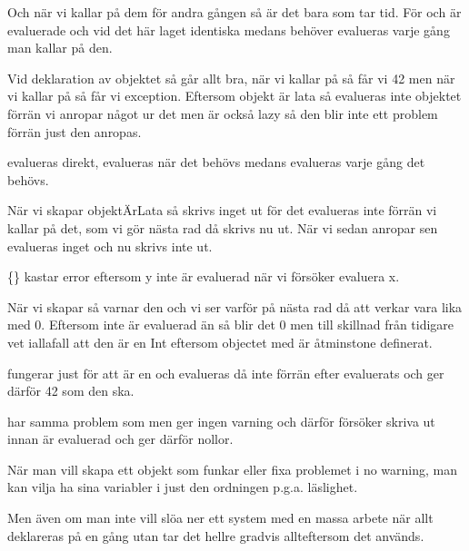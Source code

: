 Och när vi kallar på dem för andra gången så är det bara  som tar tid. För  och  är evaluerade och vid det här laget identiska medans  behöver evalueras varje gång man kallar på den.

Vid deklaration av objektet så går allt bra, när vi kallar på  så får vi 42 men när vi kallar på  så får vi exception. Eftersom objekt är lata så evalueras inte objektet förrän vi anropar något ur det men  är också lazy så den blir inte ett problem förrän just den anropas.

\SubtaskSolved
{} evalueras direkt,  evalueras när det behövs medans  evalueras varje gång det behövs.

\SubtaskSolved
När vi skapar objektÄrLata så skrivs inget ut för det evalueras inte förrän vi kallar på det, som vi gör nästa rad då skrivs nu ut. När vi sedan anropar sen evalueras inget och nu skrivs inte ut.

\{\} kastar error eftersom y inte är evaluerad när vi försöker evaluera x.

När vi skapar  så varnar den och vi ser varför på nästa rad då att  verkar vara lika med 0. Eftersom  inte är evaluerad än så blir det 0 men till skillnad från tidigare vet  iallafall att den är en Int eftersom objectet med  är åtminstone definerat.

 fungerar just för att  är en  och evalueras då inte förrän efter  evaluerats och ger därför 42 som den ska.

 har samma problem som  men ger ingen varning och därför försöker skriva ut innan  är evaluerad och ger därför nollor.

\SubtaskSolved
När man vill skapa ett objekt som funkar eller fixa problemet i no warning, man kan vilja ha sina variabler i just den ordningen p.g.a. läslighet.

Men även om man inte vill slöa ner ett system med en massa arbete när allt deklareras på en gång utan tar det hellre gradvis allteftersom det används.



\QUESTEND









